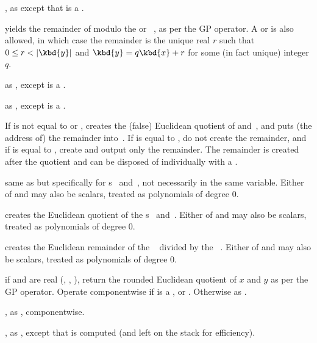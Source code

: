 , as 
except that  is a .

 yields the remainder of 
modulo the  or ~, as per the \kbd{\%} GP operator.
A  or   is also allowed, in which case the
remainder is the unique real $r$ such that $0 \leq r < |\kbd{y}|$ and
$\kbd{y} = q\kbd{x} + r$ for some (in fact unique) integer $q$.

 as , except  is
a .

 as , except  is
a .

 If  is not equal to
 or , creates the (false) Euclidean quotient of
 and~, and puts (the address of) the remainder into~.
If  is equal to , do not create the remainder, and if
 is equal to , create and output only the remainder.
The remainder is created after the quotient and can be disposed of
individually with a .

 same as  but
specifically for s~ and~, not necessarily in the same
variable. Either of  and  may also be scalars, treated as
polynomials of degree $0$.

 creates the Euclidean quotient of the
s~ and~. Either of  and  may also be
scalars, treated as polynomials of degree $0$.

 creates the Euclidean remainder of the
~ divided by the ~. Either of  and
 may also be scalars, treated as polynomials of degree $0$.


 if  and  are real
(, , ), return the rounded Euclidean quotient of
$x$ and $y$ as per the \kbd{\bs/} GP operator. Operate componentwise if
 is a ,  or . Otherwise as .

, as ,
componentwise.

, as , except that
 is computed (and left on the stack for efficiency).

